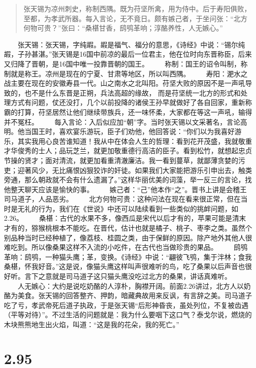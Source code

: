 \documentclass[]{book}
\begin{document}
\begin{quote}
张天锡为凉州刺史，称制西隅。既为苻坚所禽，用为侍中。后于寿阳俱败，至都，为孝武所器。每入言论，无不竟日。颇有嫉己者，于坐问张：``北方何物可贵？''张曰：``桑椹甘香，鸱鸮革响；淳酪养性，人无嫉心。''
\end{quote}

　　张天锡：张天锡，字纯嘏。嘏是福气、福分的意思，《诗经》中说：``锡尔纯嘏，子孙甚湛。''张天锡是16国中前凉的最后一位君主，他在位时向东晋称臣，后来又归降了晋朝，是16国中唯一投靠晋朝的国王。
　　称制：国王的诏令叫制，称制就是称王。凉州是现在的宁夏、甘肃等地区，所以叫西隅。
　　寿阳：淝水之战主要在现在的安徽寿县一代。山之南水之北叫阳。苻坚大败的原因不是一声吼导致的，也不是什么东晋是正朔，兵法高超的缘故，
而是苻坚统一北方的形式和处理方式有问题，仗还没打，几个以前投降的诸侯王孙早就做好了各自回家，重新称霸的打算，苻坚居然让他们继续带族兵，还一味怀柔，大家都在等这一声吼，输得并不冤枉。
　　每入言论：入后似应加``朝''字。当时张天锡以文采著名，言论高明。他当国王时，喜欢宴乐游玩，臣子们劝他，他回答说：``你们以为我喜好游乐，其实我用心良苦谁知道！我从中在体会人生的哲理：看到花开茂盛，我就敬重才华俊秀的士人；品玩芝兰，就更加敬重德行高洁的臣子。看到松竹，就想起忠贞节操的贤才；面对清流，就更加看重清澈廉洁。我一看到蔓草，就鄙薄贪婪的污吏；迎著风少，无比痛恨凶狠狡诈的奸徒。如果我们大家能把游乐引申出去，触类旁通，那么朝政就不会有什么遗漏了。''这样华丽优美的词藻，举一反三的言论，找他整天聊天应该是愉快的事。
　　嫉己者：``己''他本作``之''。晋书上讲是会稽王司马道子，人品恶劣。
　　北方何物可贵：这种问法在现在看来很正常，但在当时是无礼的行为，我们在《世说》中还可以陆续看到一些类似的挑衅问题，如2.26。
　　桑椹：古代的水果不多，像西瓜是宋代以后才有的，苹果可能是清末才有的，猕猴桃根本不能吃。在晋代，估计也就是橘子、桃子、枣李之类。虽然个别品种当时已经种植了，像荔枝、桂圆之类，由于保鲜的原因。除产地外其他人很难吃到。所以像桑果这样不入流的小吃件，在古代也当做珍贵的果品。
　　鸱鸮革响：鸱鸮，一种猫头鹰；革，变换。《诗经》中说：``翩彼飞鸮，集于泮林；食我桑椹，怀我好音。''这是说，像猫头鹰这样叫声很难听的鸟，吃了桑果以后声音也很好听。言下之意就是司马道子这只猫头鹰没吃过北方的桑果，讲话真难听。
　　人无嫉心：大约是说吃奶酪的人淳朴，胸襟开阔。前面2.26讲过，北方人以奶酪为美食。张天锡的回答整齐、押韵，暗藏典故用来反讽，有言辞之美。司马道子吃了亏，孝武帝死后道子执政，于是张天锡``后形神昏丧，虽处列位，不复被齿遇（平等对待）''。不过生活的问题就是：我为什么要咽下这口气？泰戈尔说，燃烧的木块熊熊地生出火焰，叫道：``这是我的花朵，我的死亡。''

\section{2.95}\label{section-141}
\end{document}
